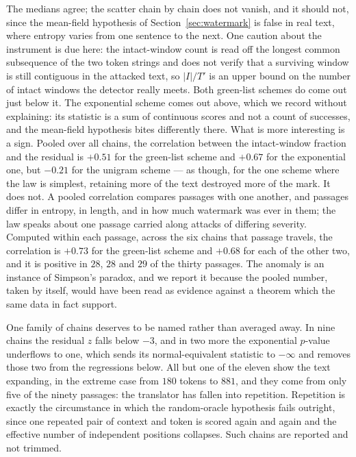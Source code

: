 \documentclass{article}
\theoremstyle{plain}
\theoremstyle{definition}
\numberwithin{equation}{section}
\begin{document}
The medians agree; the scatter chain by chain does not vanish, and it
should not, since the mean-field hypothesis of
Section~\ref{sec:watermark} is false in real text, where entropy varies
from one sentence to the next. One caution about the instrument is due
here: the intact-window count is read off the longest common
subsequence of the two token strings and does not verify that a
surviving window is still contiguous in the attacked text, so $|I|/T'$
is an upper bound on the number of intact windows the detector really
meets. Both green-list schemes do come out just below it. The
exponential scheme comes out above, which we record without explaining:
its statistic is a sum of continuous scores and not a count of
successes, and the mean-field hypothesis bites differently there. What is more interesting is a sign.
Pooled over all chains, the correlation between the intact-window
fraction and the residual is $+0.51$ for the green-list scheme and
$+0.67$ for the exponential one, but $-0.21$ for the unigram scheme ---
as though, for the one scheme where the law is simplest, retaining more
of the text destroyed more of the mark. It does not. A pooled
correlation compares passages with one another, and passages differ in
entropy, in length, and in how much watermark was ever in them; the law
speaks about one passage carried along attacks of differing severity.
Computed within each passage, across the six chains that passage
travels, the correlation is $+0.73$ for the green-list scheme and
$+0.68$ for each of the other two, and it is positive in $28$, $28$ and
$29$ of the thirty passages. The anomaly is
an instance of Simpson's paradox, and we report it because the pooled
number, taken by itself, would have been read as evidence against a
theorem which the same data in fact support.

One family of chains deserves to be named rather than averaged away. In
nine chains the residual $z$ falls below $-3$, and in two more the
exponential $p$-value underflows to one, which sends its
normal-equivalent statistic to $-\infty$ and removes those two from the
regressions below. All but one of the eleven show the text expanding,
in the extreme case from $180$ tokens to $881$, and they come from only
five of the ninety passages: the translator has fallen into repetition.
Repetition is exactly the circumstance in which the random-oracle
hypothesis fails outright, since one repeated pair of context and token
is scored again and again and the effective number of independent
positions collapses. Such chains are reported and not trimmed.
\end{document}

